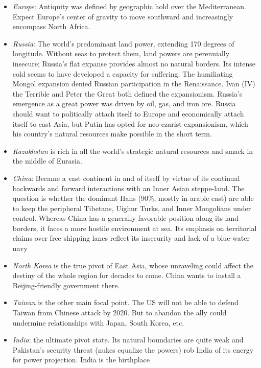 \documentclass[
]{article}
\begin{document}
\begin{itemize}
\item
  \emph{Europe}: Antiquity was defined by geographic hold over the
  Mediterranean. Expect Europe's center of gravity to move southward and
  increasingly encompass North Africa.
\item
  \emph{Russia}: The world's predominant land power, extending 170
  degrees of longitude. Without seas to protect them, land powers are
  perennially insecure; Russia's flat expanse provides almost no natural
  borders. Its intense cold seems to have developed a capacity for
  suffering. The humiliating Mongol expansion denied Russian
  participation in the Renaissance. Ivan (IV) the Terrible and Peter the
  Great both defined the expansionism. Russia's emergence as a great
  power was driven by oil, gas, and iron ore. Russia should want to
  politically attach itself to Europe and economically attach itself to
  east Asia, but Putin has opted for neo-czarist expansionism, which his
  country's natural resources make possible in the short term.
\item
  \emph{Kazakhstan} is rich in all the world's strategic natural
  resources and smack in the middle of Eurasia.
\item
  \emph{China}: Became a vast continent in and of itself by virtue of
  its continual backwards and forward interactions with an Inner Asian
  steppe-land. The question is whether the dominant Hans (90\%, mostly
  in arable east) are able to keep the peripheral Tibetans, Uighur
  Turks, and Inner Mongolians under control. Whereas China has a
  generally favorable position along its land borders, it faces a more
  hostile environment at sea. Its emphasis on territorial claims over
  free shipping lanes reflect its insecurity and lack of a blue-water
  navy
\item
  \emph{North Korea} is the true pivot of East Asia, whose unraveling
  could affect the destiny of the whole region for decades to come.
  China wants to install a Beijing-friendly government there.
\item
  \emph{Taiwan} is the other main focal point. The US will not be able
  to defend Taiwan from Chinese attack by 2020. But to abandon the ally
  could undermine relationships with Japan, South Korea, etc.
\item
  \emph{India}: the ultimate pivot state. Its natural boundaries are
  quite weak and Pakistan's security threat (nukes equalize the powers)
  rob India of its energy for power projection. India is the birthplace

\end{itemize}
\end{document}
